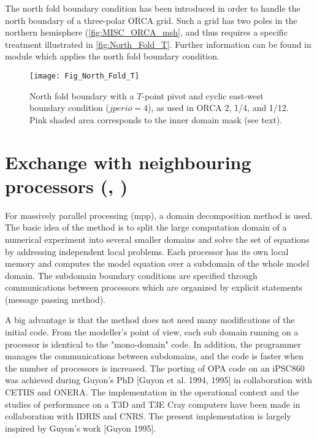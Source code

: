 \documentclass[../main/NEMO_manual]{subfiles}
\begin{document}
The north fold boundary condition has been introduced in order to handle the north boundary of
a three-polar ORCA grid.
Such a grid has two poles in the northern hemisphere (\autoref{fig:MISC_ORCA_msh},
and thus requires a specific treatment illustrated in \autoref{fig:North_Fold_T}. 
Further information can be found in  module which applies the north fold boundary condition.

\begin{figure}[!t]
  \begin{center}
    \texttt{[image: Fig\_North\_Fold\_T]}
    \caption{
      \protect\label{fig:North_Fold_T}
      North fold boundary with a $T$-point pivot and cyclic east-west boundary condition ($jperio=4$),
      as used in ORCA 2, 1/4, and 1/12.
      Pink shaded area corresponds to the inner domain mask (see text).
    }
  \end{center}
\end{figure}

\section{Exchange with neighbouring processors (\protect{}, \protect{})}
\label{sec:LBC_mpp}

For massively parallel processing (mpp), a domain decomposition method is used.
The basic idea of the method is to split the large computation domain of a numerical experiment into
several smaller domains and solve the set of equations by addressing independent local problems.
Each processor has its own local memory and computes the model equation over a subdomain of the whole model domain.
The subdomain boundary conditions are specified through communications between processors which
are organized by explicit statements (message passing method).

A big advantage is that the method does not need many modifications of the initial \fortran code.
From the modeller's point of view, each sub domain running on a processor is identical to the "mono-domain" code.
In addition, the programmer manages the communications between subdomains,
and the code is faster when the number of processors is increased.
The porting of OPA code on an iPSC860 was achieved during Guyon's PhD [Guyon et al. 1994, 1995]
in collaboration with CETIIS and ONERA.
The implementation in the operational context and the studies of performance on
a T3D and T3E Cray computers have been made in collaboration with IDRIS and CNRS.
The present implementation is largely inspired by Guyon's work [Guyon 1995].
\end{document}
